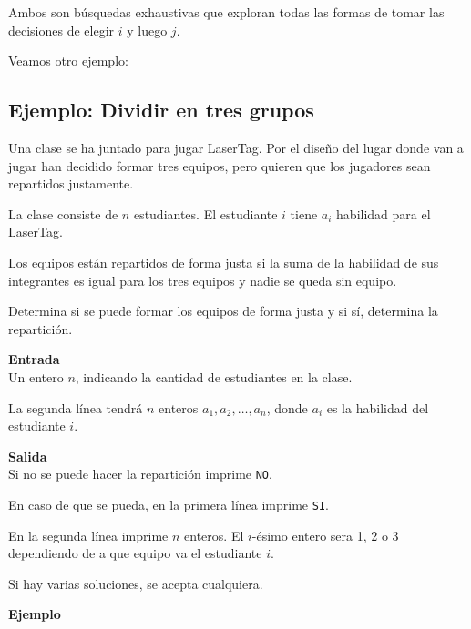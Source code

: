 Ambos son búsquedas exhaustivas que exploran todas las formas de tomar las decisiones de elegir \(i\) y luego \(j\).

Veamos otro ejemplo:

\subsection{Ejemplo: Dividir en tres grupos}
Una clase se ha juntado para jugar LaserTag. Por el diseño del lugar donde van a jugar han decidido formar tres equipos, pero quieren que los jugadores sean repartidos justamente.

La clase consiste de \(n\) estudiantes. El estudiante \(i\) tiene \(a_i\) habilidad para el LaserTag. 

Los equipos están repartidos de forma justa si la suma de la habilidad de sus integrantes es igual para los tres equipos y nadie se queda sin equipo.

Determina si se puede formar los equipos de forma justa y si sí, determina la repartición.

\textbf{Entrada}\\
Un entero \(n\), indicando la cantidad de estudiantes en la clase.

La segunda línea tendrá \(n\) enteros \(a_1, a_2, \ldots, a_n\), donde \(a_i\) es la habilidad del estudiante \(i\).

\textbf{Salida}\\
Si no se puede hacer la repartición imprime \verb|NO|.

En caso de que se pueda, en la primera línea imprime \verb|SI|.

En la segunda línea imprime \(n\) enteros. El \(i\)-ésimo entero sera 1, 2 o 3 dependiendo de a que equipo va el estudiante \(i\). 

Si hay varias soluciones, se acepta cualquiera.

\begin{samepage}
	\textbf{Ejemplo}\\
	\begin{casebox3}
	\end{casebox3}

\end{samepage}

